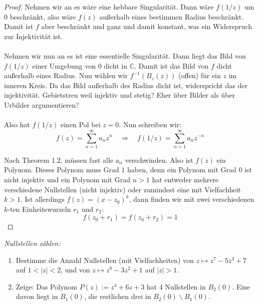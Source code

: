 \documentclass[11pt]{article}
\newcommand{\C}{\mathbb{C}}
\newenvironment{problem}[2][Beispiel]{
    \begin{trivlist}
        \item[\hskip \labelsep {\bfseries #1}\hskip \labelsep {\bfseries #2.}] \itshape}{
    \end{trivlist}\normalshape
}
\begin{document}
    \begin{proof}
        Nehmen wir an es wäre eine hebbare Singularität. Dann wäre $f(1/z)$ um $0$ beschränkt, also
        wäre $f(z)$ außerhalb eines bestimmen Radius beschränkt. Damit ist $f$ aber beschränkt und ganz und
        damit konstant, was ein Widerspruch zur Injektivität ist. \\\\
        Nehmen wir nun an es ist eine essentielle Singularität. Dann liegt das Bild von $f(1/z)$
        einer Umgebung von $0$ dicht in $\C$. Damit ist das Bild von $f$ dicht außerhalb eines Radius.
        Nun wählen wir $f^{-1}(B_\varepsilon(z))$ (offen) für ein $z$ im inneren Kreis. Da das Bild außerhalb
        des Radius dicht ist, widerspricht das der injektivität. Gebietstreu weil
        injektiv und stetig? Eher über Bilder als über Urbilder argumentieren? \\\\
        Also hat $f(1/z)$ einen Pol bei $z=0$. Nun schreiben wir:
        $$f(z) = \sum_{n=1}^\infty a_n z^n \quad\Rightarrow \quad f(1/z)=\sum_{n=1}^\infty a_n z^{-n}$$

        Nach Theorem 1.2, müssen fast alle $a_n$ verschwinden. Also ist $f(z)$ ein Polynom. Dieses Polynom
        muss Grad $1$ haben, denn ein Polynom mit Grad $0$ ist nicht injektiv und ein Polynom mit
        Grad $n>1$ hat entweder mehrere verschiedene Nullstellen (nicht injektiv) oder zumindest eine mit
        Vielfachheit $k>1$. Ist allerdings $f(z) = (x-z_0)^k$, dann finden wir mit zwei verschiedenen
        $k$-ten Einheitswurzeln $r_1$ und $r_2$:
        $$f(z_0 +r_1) = f(z_0+r_2) = 1$$
    \end{proof}

    \begin{problem}{4}
        Nullstellen zählen:
        \begin{enumerate}[label = (\alph*)]
            \item Bestimme die Anzahl Nullstellen (mit Vielfachheiten) von $z \mapsto z^7-5 z^3+7$ auf $1<|z|<2$, und
            von $z \mapsto z^8-3 z^2+1$ auf $|z|>1$.
            \item Zeige: Das Polynom $P(z):=z^4+6 z+3$ hat 4 Nullstellen in $B_2(0)$. Eine davon liegt in $B_1(0)$, die
            restlichen drei in $B_2(0) \backslash B_1(0)$.
        \end{enumerate}
    \end{problem}
\end{document}
